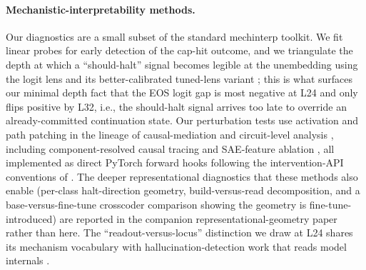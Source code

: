 \documentclass[11pt]{article}
\begin{document}
\paragraph{Mechanistic-interpretability methods.}
Our diagnostics are a small subset of the standard mechinterp toolkit. We fit linear
probes \citep{alain2016probes} for early detection of the cap-hit outcome, and we
triangulate the depth at which a ``should-halt'' signal becomes legible at the unembedding
using the logit lens \citep{nostalgebraist2020logitlens} and its better-calibrated
tuned-lens variant \citep{belrose2023tunedlens}; this is what surfaces our minimal depth
fact that the EOS logit gap is most negative at L24 and only flips positive by L32, i.e.,
the should-halt signal arrives too late to override an already-committed continuation
state. Our perturbation tests use activation and path patching in the lineage of
causal-mediation and circuit-level analysis \citep{meng2022rome,wang2023ioi}, including
component-resolved causal tracing \citep{fcct2025} and SAE-feature ablation
\citep{bricken2023monosemanticity,saelens2024,park2025save}, all implemented as direct
PyTorch forward hooks following the intervention-API conventions of
\citep{pyvene2024,nnsight2024}. The deeper representational diagnostics that these methods
also enable (per-class halt-direction geometry, build-versus-read decomposition, and a
base-versus-fine-tune crosscoder comparison \citep{dfc2025} showing the geometry is
fine-tune-introduced) are reported in the companion representational-geometry paper rather
than here. The ``readout-versus-locus'' distinction we draw at L24 shares its mechanism
vocabulary with hallucination-detection work that reads model internals
\citep{redeep2024}.
\end{document}
